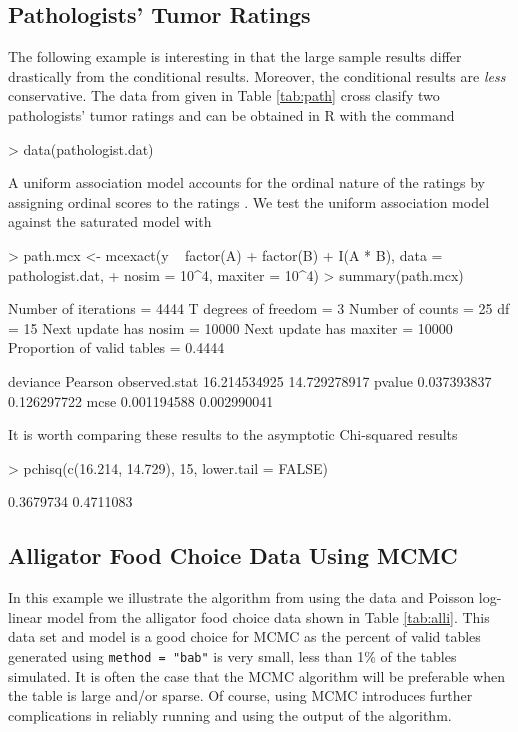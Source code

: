 \documentclass[a4paper]{article}
\begin{document}
\subsection{Pathologists' Tumor Ratings}
\label{path}
The following example is interesting in that the large sample results
differ drastically from the conditional results. Moreover, the
conditional results are {\em less} conservative. 
The data from given in Table \ref{tab:path} cross clasify two pathologists'
tumor ratings and can be obtained in R with the command
\begin{Schunk}
\begin{Sinput}
> data(pathologist.dat)
\end{Sinput}
\end{Schunk}
A uniform association model accounts for the ordinal nature of the
ratings by assigning ordinal scores to the ratings
\citep[see][]{agre:1990}. We test the uniform
association model against the saturated model with
\begin{Schunk}
\begin{Sinput}
> path.mcx <- mcexact(y ~ factor(A) + factor(B) + I(A * B), data = pathologist.dat, 
+     nosim = 10^4, maxiter = 10^4)
> summary(path.mcx)
\end{Sinput}
\begin{Soutput}
Number of iterations       =  4444 
T degrees of freedom       =  3 
Number of counts           =  25 
df                         =  15 
Next update has nosim      =  10000 
Next update has maxiter    =  10000 
Proportion of valid tables =  0.4444 

                  deviance      Pearson
observed.stat 16.214534925 14.729278917
pvalue         0.037393837  0.126297722
mcse           0.001194588  0.002990041
\end{Soutput}
\end{Schunk}
It is worth comparing these results to the asymptotic Chi-squared 
results
\begin{Schunk}
\begin{Sinput}
> pchisq(c(16.214, 14.729), 15, lower.tail = FALSE)
\end{Sinput}
\begin{Soutput}
[1] 0.3679734 0.4711083
\end{Soutput}
\end{Schunk}

\subsection{Alligator Food Choice Data Using MCMC}
In this example we illustrate the algorithm
from\cite{caffo:booth:2000} using the data and Poisson log-linear
model from the alligator food choice data shown in Table
\ref{tab:alli}.  This data set and model is a good choice for MCMC as
the percent of valid tables generated using \texttt{method = "bab"} is
very small, less than 1\% of the tables simulated. It is often the
case that the MCMC algorithm will be preferable when the table is
large and/or sparse.  Of course, using MCMC introduces further
complications in reliably running and using the output of the
algorithm.
\end{document}
